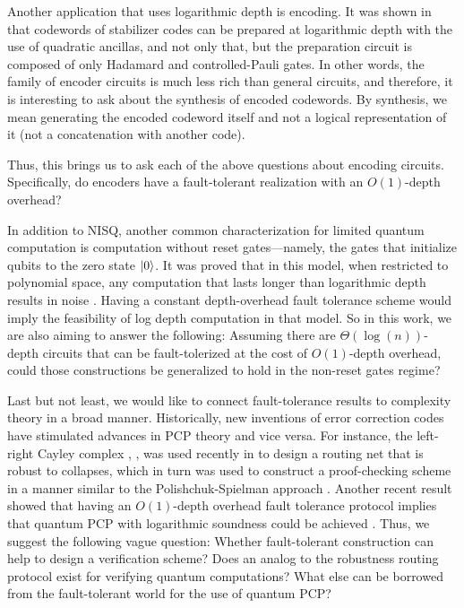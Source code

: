 \documentclass[manuscript,screen,review]{acmart}
\begin{document}
{Another application that uses logarithmic depth is encoding. It was shown in \cite{moore1998parallel} that codewords of stabilizer codes can be prepared at logarithmic depth with the use of quadratic ancillas, and not only that, but the preparation circuit is composed of only Hadamard and controlled-Pauli gates. In other words, the family of encoder circuits is much less rich than general circuits, and therefore, it is interesting to ask about the synthesis of encoded codewords. By synthesis, we mean generating the encoded codeword itself and not a logical representation of it (not a concatenation with another code).

Thus, this brings us to ask each of the above questions about encoding circuits. Specifically, do encoders have a fault-tolerant realization with an $O(1)$-depth overhead?

In addition to NISQ, another common characterization for limited quantum computation is computation without reset gates—namely, the gates that initialize qubits to the zero state $\ket{0}$. It was proved that in this model, when restricted to polynomial space, any computation that lasts longer than logarithmic depth results in noise \cite{aharonov1996limitationsnoisyreversiblecomputation}. Having a constant depth-overhead fault tolerance scheme would imply the feasibility of log depth computation in that model. So in this work, we are also aiming to answer the following: Assuming there are $\Theta(\log(n))$-depth circuits that can be fault-tolerized at the cost of $O(1)$-depth overhead, could those constructions be generalized to hold in the non-reset gates regime?

Last but not least, we would like to connect fault-tolerance results to complexity theory in a broad manner. Historically, new inventions of error correction codes have stimulated advances in PCP theory and vice versa. For instance, the left-right Cayley complex \cite{Dinur}, \cite{leverrier2022quantum}, \cite{Pavel} was used recently in \cite{bafna2024quasilinearsizepcpssmall} to design a routing net that is robust to collapses, which in turn was used to construct a proof-checking scheme in a manner similar to the Polishchuk-Spielman approach \cite{10.1145/195058.195132}. Another recent result showed that having an $O(1)$-depth overhead fault tolerance protocol implies that quantum PCP with logarithmic soundness could be achieved \cite{Anshu_2024}. Thus, we suggest the following vague question: Whether fault-tolerant construction can help to design a verification scheme? Does an analog to the robustness routing protocol exist for verifying quantum computations? What else can be borrowed from the fault-tolerant world for the use of quantum PCP?


}
\end{document}
